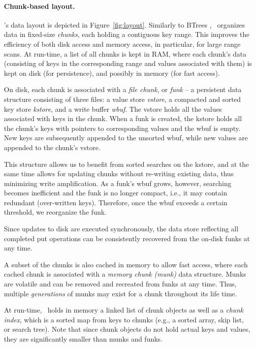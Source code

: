 \paragraph{Chunk-based layout.}

\sys's data layout is depicted in Figure~\ref{fig:layout}.
Similarly to BTrees , 
\sys\ organizes data in fixed-size \emph{chunks}, each holding a contiguous key range.
This improves the efficiency of both disk access and memory access, in particular, for large range scans. 
At run-time, a list of all chunks is kept in RAM, where each chunk's data 
(consisting of keys in the corresponding range and values associated with them) 
is kept on disk (for persistence), and possibly in memory (for fast access). 

On disk, each chunk is associated with a \emph{file chunk}, or \emph{funk} --
a persistent data structure consisting of three files:  a value store \emph{vstore}, 
a compacted and sorted  key store \emph{kstore}, and a write buffer \emph{wbuf}. The vstore holds all the values associated with keys
in the chunk. When a funk is created, the kstore holds all the chunk's keys with pointers to corresponding values and the wbuf is empty.
New keys are subsequently appended to the unsorted wbuf, while new values are appended to the chunk's vstore.

This structure allows us to benefit from sorted searches on the kstore, and at the same time
allows for updating chunks without re-writing existing data, thus minimizing write amplification.
As a funk's wbuf grows, however, searching becomes inefficient   and  
the funk is no longer compact, i.e., it may contain redundant (over-written keys).
Therefore, once the wbuf exceeds a certain threshold, we reorganize the funk.

Since updates to disk are executed synchronously,  the data store reflecting all completed put operations 
can be consistently recovered from the on-disk funks at any time. 

A subset of the chunks is also cached in memory to allow fast access, where each cached chunk is associated with a
\emph{memory chunk (munk)}  data structure. 
Munks are volatile and can be removed and recreated from funks at any time.
Thus, multiple \emph{generations} of munks may exist for a chunk throughout its life time.


At run-time, \sys\ holds in memory a linked list of chunk objects as well as 
a \emph{chunk index}, which is a sorted map from keys to chunks (e.g., a sorted array, skip list, or search tree).
Note that since chunk objects do not hold actual keys and values, they are significantly smaller than munks and funks. 


